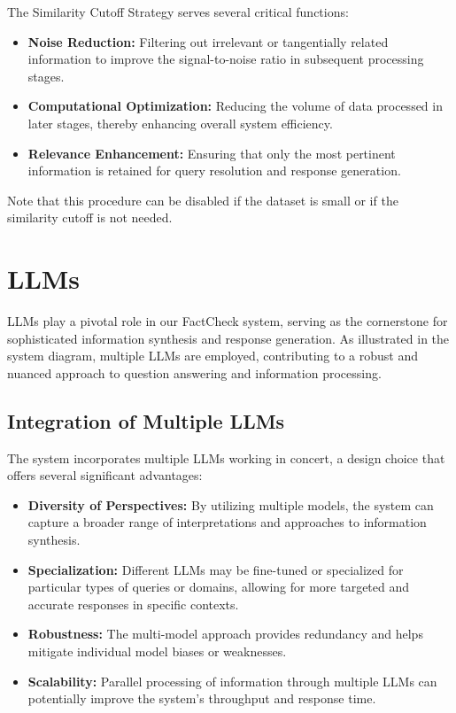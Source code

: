 The Similarity Cutoff Strategy serves several critical functions:
\begin{itemize}
    \item \textbf{Noise Reduction:} Filtering out irrelevant or tangentially related information to improve the signal-to-noise ratio in subsequent processing stages.
    \item \textbf{Computational Optimization:} Reducing the volume of data processed in later stages, thereby enhancing overall system efficiency.
    \item \textbf{Relevance Enhancement:} Ensuring that only the most pertinent information is retained for query resolution and response generation.
\end{itemize}

Note that this procedure can be disabled if the dataset is small or if the similarity cutoff is not needed.

\section{LLMs}\label{sec:large-language-models-llms-in-the-system}
\ac{LLMs} play a pivotal role in our FactCheck system, serving as the cornerstone for sophisticated information synthesis and response generation.
As illustrated in the system diagram, multiple LLMs are employed, contributing to a robust and nuanced approach to question answering and information processing.

\subsection{Integration of Multiple LLMs}\label{subsec:integration-of-multiple-llms}
The system incorporates multiple LLMs working in concert, a design choice that offers several significant advantages:
\begin{itemize}
    \item \textbf{Diversity of Perspectives:} By utilizing multiple models, the system can capture a broader range of interpretations and approaches to information synthesis.
    \item \textbf{Specialization:} Different LLMs may be fine-tuned or specialized for particular types of queries or domains, allowing for more targeted and accurate responses in specific contexts.
    \item \textbf{Robustness:} The multi-model approach provides redundancy and helps mitigate individual model biases or weaknesses.
    \item \textbf{Scalability:} Parallel processing of information through multiple LLMs can potentially improve the system's throughput and response time.
\end{itemize}

